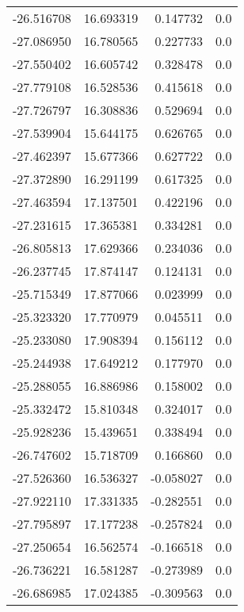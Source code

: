 \begin{tabular}{rrrr}
      -26.516708 &        16.693319 &    0.147732 &   0.0 \\
      -27.086950 &        16.780565 &    0.227733 &   0.0 \\
      -27.550402 &        16.605742 &    0.328478 &   0.0 \\
      -27.779108 &        16.528536 &    0.415618 &   0.0 \\
      -27.726797 &        16.308836 &    0.529694 &   0.0 \\
      -27.539904 &        15.644175 &    0.626765 &   0.0 \\
      -27.462397 &        15.677366 &    0.627722 &   0.0 \\
      -27.372890 &        16.291199 &    0.617325 &   0.0 \\
      -27.463594 &        17.137501 &    0.422196 &   0.0 \\
      -27.231615 &        17.365381 &    0.334281 &   0.0 \\
      -26.805813 &        17.629366 &    0.234036 &   0.0 \\
      -26.237745 &        17.874147 &    0.124131 &   0.0 \\
      -25.715349 &        17.877066 &    0.023999 &   0.0 \\
      -25.323320 &        17.770979 &    0.045511 &   0.0 \\
      -25.233080 &        17.908394 &    0.156112 &   0.0 \\
      -25.244938 &        17.649212 &    0.177970 &   0.0 \\
      -25.288055 &        16.886986 &    0.158002 &   0.0 \\
      -25.332472 &        15.810348 &    0.324017 &   0.0 \\
      -25.928236 &        15.439651 &    0.338494 &   0.0 \\
      -26.747602 &        15.718709 &    0.166860 &   0.0 \\
      -27.526360 &        16.536327 &   -0.058027 &   0.0 \\
      -27.922110 &        17.331335 &   -0.282551 &   0.0 \\
      -27.795897 &        17.177238 &   -0.257824 &   0.0 \\
      -27.250654 &        16.562574 &   -0.166518 &   0.0 \\
      -26.736221 &        16.581287 &   -0.273989 &   0.0 \\
      -26.686985 &        17.024385 &   -0.309563 &   0.0 \\

\end{tabular}
